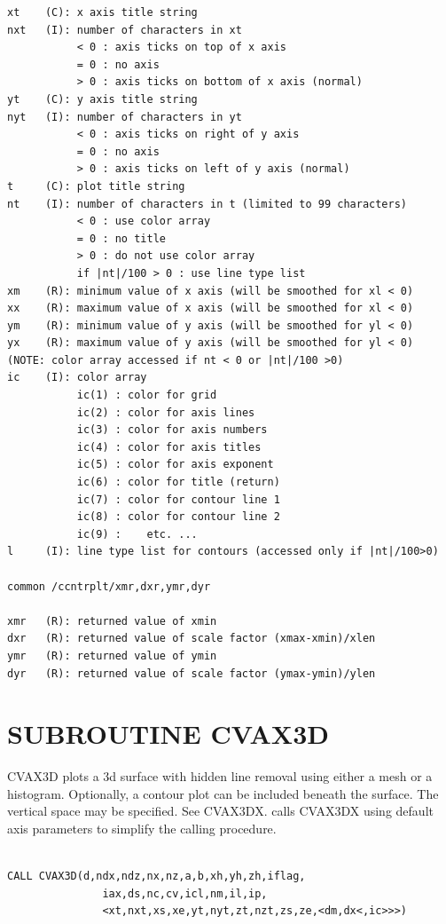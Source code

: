 \documentclass[11pt]{report}
\begin{document}
\begin{verbatim}
xt    (C): x axis title string
nxt   (I): number of characters in xt
           < 0 : axis ticks on top of x axis
           = 0 : no axis
           > 0 : axis ticks on bottom of x axis (normal)
yt    (C): y axis title string
nyt   (I): number of characters in yt
           < 0 : axis ticks on right of y axis
           = 0 : no axis
           > 0 : axis ticks on left of y axis (normal)
t     (C): plot title string
nt    (I): number of characters in t (limited to 99 characters)
           < 0 : use color array
           = 0 : no title
           > 0 : do not use color array
           if |nt|/100 > 0 : use line type list
xm    (R): minimum value of x axis (will be smoothed for xl < 0) 
xx    (R): maximum value of x axis (will be smoothed for xl < 0) 
ym    (R): minimum value of y axis (will be smoothed for yl < 0) 
yx    (R): maximum value of y axis (will be smoothed for yl < 0) 
(NOTE: color array accessed if nt < 0 or |nt|/100 >0)
ic    (I): color array 
           ic(1) : color for grid
           ic(2) : color for axis lines
           ic(3) : color for axis numbers
           ic(4) : color for axis titles
           ic(5) : color for axis exponent
           ic(6) : color for title (return)
           ic(7) : color for contour line 1
           ic(8) : color for contour line 2
           ic(9) :    etc. ...
l     (I): line type list for contours (accessed only if |nt|/100>0)

common /ccntrplt/xmr,dxr,ymr,dyr

xmr   (R): returned value of xmin
dxr   (R): returned value of scale factor (xmax-xmin)/xlen
ymr   (R): returned value of ymin
dyr   (R): returned value of scale factor (ymax-ymin)/ylen
\end{verbatim}

\newpage
\section{SUBROUTINE CVAX3D}

CVAX3D plots a 3d surface with hidden line removal using either
a mesh or a histogram.  Optionally, a contour plot can be included
beneath the surface.  The vertical space may be specified.
See CVAX3DX.
 calls CVAX3DX using default axis parameters to simplify the calling
procedure.
\begin{verbatim}

CALL CVAX3D(d,ndx,ndz,nx,nz,a,b,xh,yh,zh,iflag,
               iax,ds,nc,cv,icl,nm,il,ip,
               <xt,nxt,xs,xe,yt,nyt,zt,nzt,zs,ze,<dm,dx<,ic>>>)
\end{verbatim}
\end{document}

